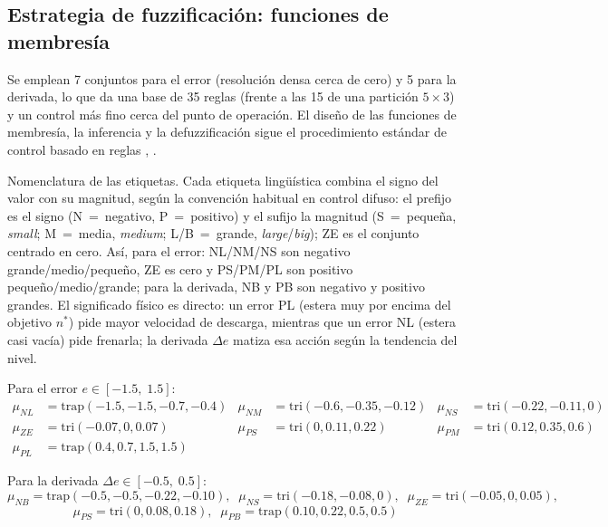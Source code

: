 \subsection*{Estrategia de fuzzificación: funciones de membresía}


Se emplean 7 conjuntos para el error (resolución densa cerca de cero) y 5 para la derivada, lo que da una base de 35 reglas (frente a las 15 de una partición $5\times3$) y un control más fino cerca del punto de operación. El diseño de las funciones de membresía, la inferencia y la defuzzificación sigue el procedimiento estándar de control basado en reglas \cite[cap.~5]{passino2005biomimicry}, \cite{ross2010fuzzy}.

Nomenclatura de las etiquetas. Cada etiqueta lingüística combina el signo del valor con su magnitud, según la convención habitual en control difuso: el prefijo es el signo (N~=~negativo, P~=~positivo) y el sufijo la magnitud (S~=~pequeña, \emph{small}; M~=~media, \emph{medium}; L/B~=~grande, \emph{large}/\emph{big}); ZE es el conjunto centrado en cero. Así, para el error: NL/NM/NS son negativo grande/medio/pequeño, ZE es cero y PS/PM/PL son positivo pequeño/medio/grande; para la derivada, NB y PB son negativo y positivo grandes. El significado físico es directo: un error PL (estera muy por encima del objetivo $n^*$) pide mayor velocidad de descarga, mientras que un error NL (estera casi vacía) pide frenarla; la derivada $\Delta e$ matiza esa acción según la tendencia del nivel.

Para el error $e \in [-1.5,\;1.5]$:
\begin{align*}
\mu_{NL} &= \text{trap}(-1.5,-1.5,-0.7,-0.4) & \mu_{NM} &= \text{tri}(-0.6,-0.35,-0.12) & \mu_{NS} &= \text{tri}(-0.22,-0.11,0) \\
\mu_{ZE} &= \text{tri}(-0.07,0,0.07) & \mu_{PS} &= \text{tri}(0,0.11,0.22) & \mu_{PM} &= \text{tri}(0.12,0.35,0.6) \\
\mu_{PL} &= \text{trap}(0.4,0.7,1.5,1.5) & &
\end{align*}

Para la derivada $\Delta e \in [-0.5,\;0.5]$:
\[
\mu_{NB}=\text{trap}(-0.5,-0.5,-0.22,-0.10),\;\; \mu_{NS}=\text{tri}(-0.18,-0.08,0),\;\; \mu_{ZE}=\text{tri}(-0.05,0,0.05),
\]
\[
\mu_{PS}=\text{tri}(0,0.08,0.18),\;\; \mu_{PB}=\text{trap}(0.10,0.22,0.5,0.5)
\]

